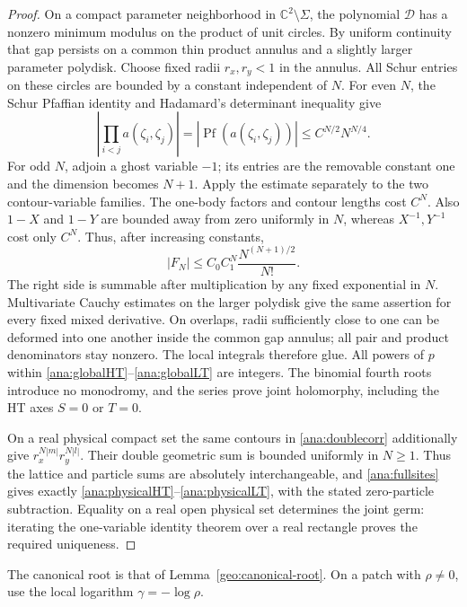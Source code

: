 \documentclass[11pt]{article}
\numberwithin{equation}{section}
\theoremstyle{definition}
\newcommand{\C}{\mathbb C}
\begin{document}
\begin{proof}
On a compact parameter neighborhood in \(\C^2\setminus\Sigma\),
the polynomial \(\mathcal D\) has a nonzero minimum modulus on the
product of unit circles. By uniform continuity that gap persists on
a common thin product annulus and a slightly larger parameter
polydisk. Choose fixed radii \(r_x,r_y<1\) in the annulus.
All Schur entries on these circles are bounded by a constant
independent of \(N\). For even \(N\), the Schur Pfaffian identity
and Hadamard's determinant inequality give
\[
 \left|\prod_{i<j}a(\zeta_i,\zeta_j)\right|
 =|\operatorname{Pf}(a(\zeta_i,\zeta_j))|
 \le C^{N/2}N^{N/4}.
\]
For odd \(N\), adjoin a ghost variable \(-1\); its entries are
the removable constant one and the dimension becomes \(N+1\).
Apply the estimate separately to the two contour-variable families.
The one-body factors and contour lengths cost \(C^N\).
Also \(1-X\) and \(1-Y\) are bounded away from zero uniformly in
\(N\), whereas \(X^{-1},Y^{-1}\) cost only \(C^N\).
Thus, after increasing constants,
\begin{equation}\label{ana:compactbound}
 |F_N|\le C_0 C_1^N\frac{N^{(N+1)/2}}{N!}.
\end{equation}
The right side is summable after multiplication by any fixed
exponential in \(N\). Multivariate Cauchy estimates on the larger
polydisk give the same assertion for every fixed mixed derivative.
On overlaps, radii sufficiently close to one can be deformed into
one another inside the common gap annulus; all pair and product
denominators stay nonzero. The local integrals therefore glue.
All powers of \(p\) within \eqref{ana:globalHT}--\eqref{ana:globalLT}
are integers. The binomial fourth roots introduce no monodromy,
and the series prove joint holomorphy, including the HT axes
\(S=0\) or \(T=0\).

On a real physical compact set the same contours in
\eqref{ana:doublecorr} additionally give
\(r_x^{N|m|}r_y^{N|l|}\). Their double geometric sum is bounded
uniformly in \(N\ge1\). Thus the lattice and particle sums are
absolutely interchangeable, and \eqref{ana:fullsites} gives exactly
\eqref{ana:physicalHT}--\eqref{ana:physicalLT}, with the stated
zero-particle subtraction. Equality on a real open physical set
determines the joint germ: iterating the one-variable identity
theorem over a real rectangle proves the required uniqueness.
\end{proof}

The canonical root is that of Lemma~\ref{geo:canonical-root}.
On a patch with \(\rho\ne0\), use the local logarithm
\(\gamma=-\log\rho\).
\end{document}
